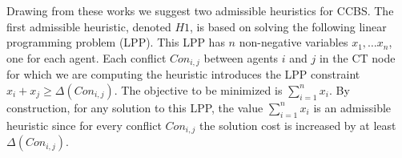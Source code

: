 \documentclass[letterpaper]{article} %
\newcommand\roni[1]{\nb{\textbf{Roni:}}{orange}{#1}}
\newcommand{\ccbs}{\ac{CCBS}\xspace}
\newcommand{\ct}{\ac{CT}\xspace}
\begin{document}
Drawing from these works we suggest two admissible heuristics for \ccbs.
The first admissible heuristic, denoted $H1$, is based on solving the following linear programming problem (LPP).
This LPP has $n$ non-negative variables $x_1,\ldots x_n$, one for each agent.
Each conflict $Con_{i,j}$ between agents $i$ and $j$
in the \ct node for which we are computing the heuristic
introduces the LPP constraint $x_i + x_j \geq \Delta(Con_{i,j})$.
The objective to be minimized is $\sum_{i=1}^n{x_i}$.
By construction, for any solution to this LPP, the value $\sum_{i=1}^n{x_i}$ is an admissible heuristic since for every conflict $Con_{i,j}$ the solution cost is increased by at least $\Delta(Con_{i,j})$.





\end{document}
